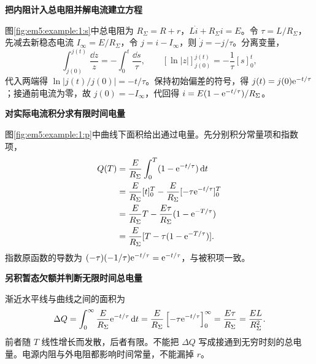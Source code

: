 \begin{solution}\textbf{把内阻计入总电阻并解电流建立方程}\par\nobreak
图\ref{fig:em5:example:1:s}中总电阻为 $R_\Sigma=R+r$，$L\dot i+R_\Sigma i=E$。令 $\tau=L/R_\Sigma$，先减去新稳态电流 $I_\infty=E/R_\Sigma$，令 $j=i-I_\infty$，则 $\dot j=-j/\tau$。分离变量，
\[
\int_{j(0)}^{j(t)}\frac{\dd z}{z}=-\int_0^t\frac{\dd s}{\tau},
 \qquad [\ln|z|]_{j(0)}^{j(t)}=-\frac1\tau[s]_0^t,
\]
代入两端得 $\ln|j(t)/j(0)|=-t/\tau$。保持初始偏差的符号，得 $j(t)=j(0)\mathrm e^{-t/\tau}$；接通前电流为零，故 $j(0)=-I_\infty$，代回得 $i=E(1-\mathrm e^{-t/\tau})/R_\Sigma$。



\par\medskip{}\noindent\textbf{对实际电流积分求有限时间电量}\par\nobreak
图\ref{fig:em5:example:1:p}中曲线下面积给出通过电量。先分别积分常量项和指数项，
\[
 \begin{aligned}
 Q(T)&=\frac E{R_\Sigma}\int_0^T(1-\mathrm e^{-t/\tau})\mathop{}\!\mathrm d t\\
 &=\frac E{R_\Sigma}[t]_0^T
   -\frac E{R_\Sigma}[-\tau\mathrm e^{-t/\tau}]_0^T\\
 &=\frac E{R_\Sigma}T-\frac{E\tau}{R_\Sigma}(1-\mathrm e^{-T/\tau})\\
 &=\frac E{R_\Sigma}[T-\tau(1-\mathrm e^{-T/\tau})].
 \end{aligned}
\]
指数原函数的导数为 $(-\tau)(-1/\tau)\mathrm e^{-t/\tau}=\mathrm e^{-t/\tau}$，与被积项一致。

\par\medskip{}\noindent\textbf{另积暂态欠额并判断无限时间总电量}\par\nobreak
渐近水平线与曲线之间的面积为
\[\Delta Q=\int_0^\infty\frac E{R_\Sigma}\mathrm e^{-t/\tau}\mathop{}\!\mathrm d t
=\frac E{R_\Sigma}\left[-\tau\mathrm e^{-t/\tau}\right]_0^\infty
=\frac{E\tau}{R_\Sigma}=\frac{EL}{R_\Sigma^2}.\]
前者随 $T$ 线性增长而发散，后者有限。不能把 $\Delta Q$ 写成接通到无穷时刻的总电量。电源内阻与外电阻都影响时间常量，不能漏掉 $r$。\par 


\end{solution}
